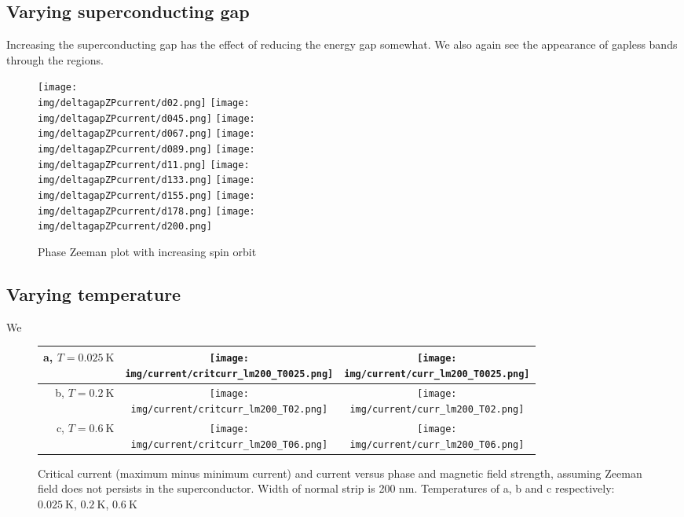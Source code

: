 \documentclass[10pt,a4paper]{article}
\newcommand{\img}{./images}
\begin{document}
	\subsection{Varying superconducting gap}
	Increasing the superconducting gap has the effect of reducing the energy gap somewhat.
	We also again see the appearance of gapless bands through the regions.
		\begin{figure}[H]
			\texttt{[image: \\img/deltagapZPcurrent/d02.png]}
			\texttt{[image: \\img/deltagapZPcurrent/d045.png]}
			\texttt{[image: \\img/deltagapZPcurrent/d067.png]}
			\texttt{[image: \\img/deltagapZPcurrent/d089.png]}
			\texttt{[image: \\img/deltagapZPcurrent/d11.png]}
			\texttt{[image: \\img/deltagapZPcurrent/d133.png]}
			\texttt{[image: \\img/deltagapZPcurrent/d155.png]}
			\texttt{[image: \\img/deltagapZPcurrent/d178.png]}
			\texttt{[image: \\img/deltagapZPcurrent/d200.png]}
			\caption{Phase Zeeman plot with increasing spin orbit}
		\end{figure}
\newpage
	\subsection{Varying temperature}
	We 
		\begin{figure}[H]
			\begin{tabular}{rcc}
				a, $T=\SI{0.025}{\K}$&\texttt{[image: \\img/current/critcurr\_lm200\_T0025.png]}&
				\texttt{[image: \\img/current/curr\_lm200\_T0025.png]}\\
				\hline
				b, $T=\SI{0.2}{\K}$&\texttt{[image: \\img/current/critcurr\_lm200\_T02.png]}&
				\texttt{[image: \\img/current/curr\_lm200\_T02.png]}\\
				\hline
				c, $T=\SI{0.6}{\K}$&\texttt{[image: \\img/current/critcurr\_lm200\_T06.png]}&
				\texttt{[image: \\img/current/curr\_lm200\_T06.png]}\\
				\hline
			\end{tabular}
			\caption{Critical current (maximum minus minimum current) and current versus phase and magnetic field strength, assuming Zeeman field does not persists in the superconductor. Width of normal strip is 200 nm. Temperatures of a, b and c respectively: $\SI{0.025}{\K}$, $\SI{0.2}{\K}$, $\SI{0.6}{\K}$}
		\end{figure}
	
\end{document}
